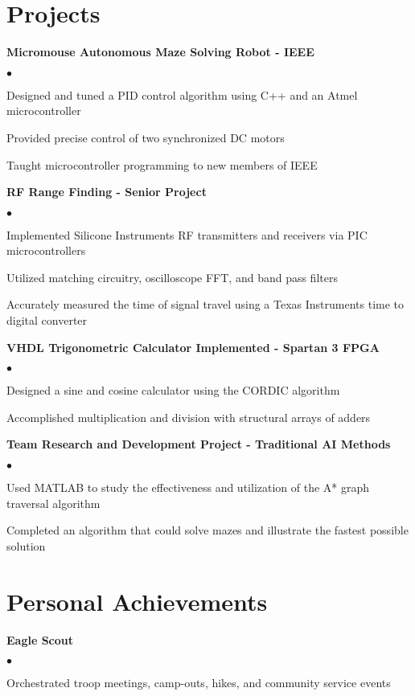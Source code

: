 \documentclass[margin,line]{res}
\newenvironment{list2}{
  \begin{list}{$\bullet$}{%
      \setlength{\itemsep}{0in}
      \setlength{\parsep}{0in} \setlength{\parskip}{0in}
      \setlength{\topsep}{0in} \setlength{\partopsep}{0in}
      \setlength{\leftmargin}{0.2in}}}{\end{list}}
\begin{document}
\begin{resume}
\section{\sc Projects}
{\bf Micromouse Autonomous Maze Solving Robot - IEEE}
\begin{list2}
\item Designed and tuned a PID control algorithm using C++ and an Atmel microcontroller 
\item Provided precise control of two synchronized DC motors
\item Taught microcontroller programming to new members of IEEE 
\end{list2}
{\bf RF Range Finding - Senior Project}
\begin{list2}
\item Implemented Silicone Instruments RF transmitters and receivers via PIC microcontrollers
\item Utilized matching circuitry, oscilloscope FFT, and band pass filters 
\item Accurately measured the time of signal travel using a Texas Instruments time to digital converter 
\end{list2}
{\bf VHDL Trigonometric Calculator Implemented - Spartan 3 FPGA}
\begin{list2}
\item Designed a sine and cosine calculator using the CORDIC algorithm
\item Accomplished multiplication and division with structural arrays of adders
\end{list2}
{\bf Team Research and Development Project - Traditional AI Methods}
\begin{list2}
\item Used MATLAB to study the effectiveness and utilization of the A* graph traversal algorithm 
\item Completed an algorithm that could solve mazes and illustrate the fastest possible solution
\end{list2}

\section{\sc Personal Achievements}
{\bf Eagle Scout}
\begin{list2}
\item Orchestrated troop meetings, camp-outs, hikes, and community service events  
\end{list2}


\end{resume}
\end{document}
